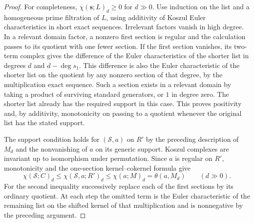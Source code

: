 \begin{proof}
For completeness, \(\chi(\mathbf{s};L)_d\ge0\) for \(d\gg0\).
Use induction on the list and a homogeneous prime filtration of \(L\),
using additivity of Koszul Euler characteristics in short exact
sequences. Irrelevant factors vanish in high degree. In a relevant
domain factor, a nonzero first section is regular and the calculation
passes to its quotient with one fewer section. If the first section
vanishes, its two-term complex gives the difference of the Euler
characteristics of the shorter list in degrees \(d\) and
\(d-\deg s_1\). This difference is also the Euler characteristic
of the shorter list on the quotient by any nonzero section of that
degree, by the multiplication exact sequence. Such a section exists
in a relevant domain by taking a product of surviving standard
generators, or \(1\) in degree zero. The shorter list already has
the required support in this case. This proves positivity and,
by additivity, monotonicity on passing to a quotient whenever the
original list has the stated support.

The support condition holds for \((\mathcal S,a)\) on \(R'\) by
the preceding description of \(M_d\) and the nonvanishing of \(a\)
on its generic support. Koszul complexes are invariant up to
isomorphism under permutation. Since \(a\) is regular on \(R'\),
monotonicity and the one-section kernel--cokernel formula give
\[
 \chi(\mathcal S;C)_d
 \le\chi(\mathcal S,a;R')_d
 \le\chi(a;M)_d=\theta(a,M_d)\qquad(d\gg0).
\]
For the second inequality successively replace each of the first
sections by its ordinary quotient. At each step the omitted term
is the Euler characteristic of the remaining list on the shifted
kernel of that multiplication and is nonnegative by the preceding
argument.


\end{proof}
